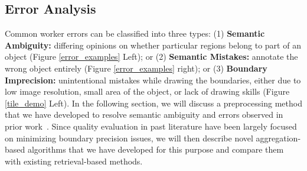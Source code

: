 \subsection{Error Analysis}
\par Common worker errors can be classified into three types: (1) \textbf{Semantic Ambiguity:} differing opinions on whether particular regions belong to part of an object (Figure \ref{error_examples} Left); or (2) \textbf{Semantic Mistakes:} annotate the wrong object entirely (Figure \ref{error_examples} right); or (3) \textbf{Boundary Imprecision:} unintentional mistakes while drawing the boundaries, either due to low image resolution, small area of the object, or lack of drawing skills (Figure \ref{tile_demo} Left). In the following section, we will discuss a preprocessing method that we have developed to resolve semantic ambiguity and errors observed in prior work~\cite{Sorokin2008,Lin2014,Gurari2018}. Since quality evaluation in past literature have been largely focused on minimizing boundary precision issues, we will then describe novel aggregation-based algorithms that we have developed for this purpose and compare them with existing retrieval-based methods.%

